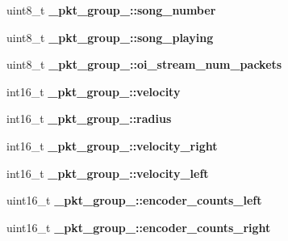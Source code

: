 \begin{DoxyCompactItemize}
\item 
\hypertarget{group__roomba-lib_ga5096e1e7aed4c59b4898a4a655032618}{}uint8\+\_\+t {\bfseries \+\_\+pkt\+\_\+group\+\_\+::song\+\_\+number}\label{group__roomba-lib_ga5096e1e7aed4c59b4898a4a655032618}

\item 
\hypertarget{group__roomba-lib_gabebdfed5c8d14b6acd67d02e7d520ef1}{}uint8\+\_\+t {\bfseries \+\_\+pkt\+\_\+group\+\_\+::song\+\_\+playing}\label{group__roomba-lib_gabebdfed5c8d14b6acd67d02e7d520ef1}

\item 
\hypertarget{group__roomba-lib_ga95dcc6454bd3e5eb15746b100ad79c1a}{}uint8\+\_\+t {\bfseries \+\_\+pkt\+\_\+group\+\_\+::oi\+\_\+stream\+\_\+num\+\_\+packets}\label{group__roomba-lib_ga95dcc6454bd3e5eb15746b100ad79c1a}

\item 
\hypertarget{group__roomba-lib_gaffeab31fb14fd98f5da391eb3459f102}{}int16\+\_\+t {\bfseries \+\_\+pkt\+\_\+group\+\_\+::velocity}\label{group__roomba-lib_gaffeab31fb14fd98f5da391eb3459f102}

\item 
\hypertarget{group__roomba-lib_gaf39cdcdd38958b46dda4a5bfc7318887}{}int16\+\_\+t {\bfseries \+\_\+pkt\+\_\+group\+\_\+::radius}\label{group__roomba-lib_gaf39cdcdd38958b46dda4a5bfc7318887}

\item 
\hypertarget{group__roomba-lib_ga211671e764f4c601d02e959428d6e02d}{}int16\+\_\+t {\bfseries \+\_\+pkt\+\_\+group\+\_\+::velocity\+\_\+right}\label{group__roomba-lib_ga211671e764f4c601d02e959428d6e02d}

\item 
\hypertarget{group__roomba-lib_ga0701b0c98b1767a26df2c4fd0c02476e}{}int16\+\_\+t {\bfseries \+\_\+pkt\+\_\+group\+\_\+::velocity\+\_\+left}\label{group__roomba-lib_ga0701b0c98b1767a26df2c4fd0c02476e}

\item 
\hypertarget{group__roomba-lib_gad81aac03cc4aa076c9518e0fd45e507c}{}uint16\+\_\+t {\bfseries \+\_\+pkt\+\_\+group\+\_\+::encoder\+\_\+counts\+\_\+left}\label{group__roomba-lib_gad81aac03cc4aa076c9518e0fd45e507c}

\item 
\hypertarget{group__roomba-lib_ga9debd2b8f2a1f9a5c011d54e25cb8fc3}{}uint16\+\_\+t {\bfseries \+\_\+pkt\+\_\+group\+\_\+::encoder\+\_\+counts\+\_\+right}\label{group__roomba-lib_ga9debd2b8f2a1f9a5c011d54e25cb8fc3}


\end{DoxyCompactItemize}
